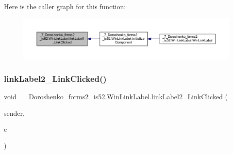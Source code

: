 Here is the caller graph for this function\+:
\nopagebreak
\begin{figure}[H]
\begin{center}
\leavevmode
\includegraphics[width=350pt]{class__7___doroshenko__forms2__is52_1_1_win_link_label_a91ad99163450a8eaf8eadb364697099a_icgraph}
\end{center}
\end{figure}
\hypertarget{class__7___doroshenko__forms2__is52_1_1_win_link_label_ae8a53f496acc807d85022947c551c316}{}\label{class__7___doroshenko__forms2__is52_1_1_win_link_label_ae8a53f496acc807d85022947c551c316} 
\subsubsection{\texorpdfstring{link\+Label2\+\_\+\+Link\+Clicked()}{linkLabel2\_LinkClicked()}}
{\footnotesize\ttfamily void \+\_\+\_\+\+Doroshenko\+\_\+forms2\+\_\+is52.\+Win\+Link\+Label.\+link\+Label2\+\_\+\+Link\+Clicked (\begin{DoxyParamCaption}\item[{object}]{sender,  }\item[{Link\+Label\+Link\+Clicked\+Event\+Args}]{e }\end{DoxyParamCaption})\hspace{0.3cm}{\ttfamily [private]}}

